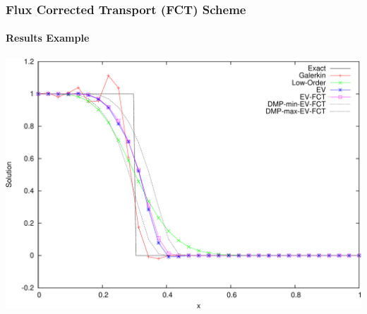 \documentclass{beamer}
\begin{document}
\begin{frame}
\frametitle{Flux Corrected Transport (FCT) Scheme}
\framesubtitle{Results Example}

\includegraphics[width=\textwidth]{./figures/advection_FCT.pdf}

\end{frame}
\end{document}

